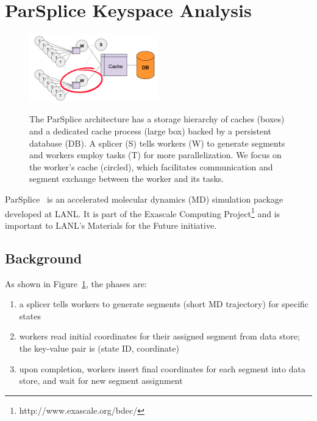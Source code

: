 \section{ParSplice Keyspace Analysis}
\label{sec:parsplice-keyspace-analysis}

\begin{figure}[t]
\noindent\includegraphics[width=0.5\textwidth]{figures/parsplice.png}\\
\caption{The ParSplice architecture has a storage hierarchy of caches (boxes) and a
dedicated cache process (large box) backed by a persistent database (DB). A splicer
(S) tells workers (W) to generate segments and workers employ tasks (T) for more
parallelization. We focus on the worker's cache (circled), which facilitates
communication and segment exchange between the worker and its tasks.
\label{fig:parsplice}}
\end{figure}

ParSplice~\cite{perez:jctc20150parsplice} is an accelerated molecular dynamics
(MD) simulation package developed at LANL. It is part of the Exascale Computing
Project\footnote{http://www.exascale.org/bdec/} and is important to LANL's
Materials for the Future initiative. 

\subsection{Background}

As shown in Figure~\ref{fig:parsplice}, the phases are:

\begin{enumerate}

  \item a splicer tells workers to generate segments (short MD trajectory) for
  specific states

  \item workers read initial coordinates for their assigned segment from data
  store; the key-value pair is (state ID, coordinate)

  \item upon completion, workers insert final coordinates for each segment into
  data store, and wait for new segment assignment

\end{enumerate}

